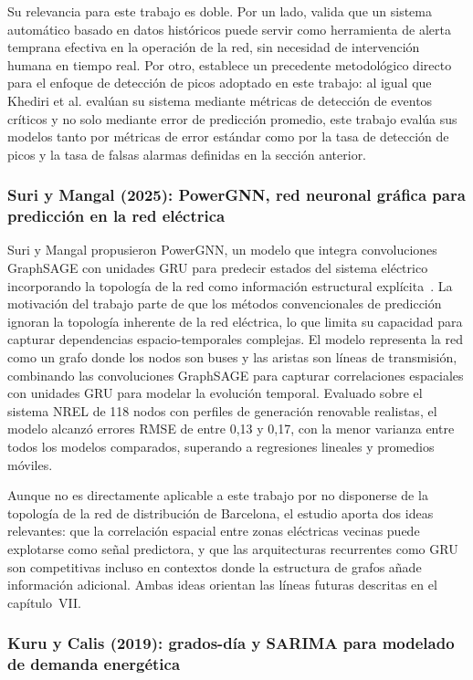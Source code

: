 \documentclass[12pt, a4paper]{article}
\begin{document}
Su relevancia para este trabajo es doble. Por un lado, valida que un sistema automático basado en datos históricos puede servir como herramienta de alerta temprana efectiva en la operación de la red, sin necesidad de intervención humana en tiempo real. Por otro, establece un precedente metodológico directo para el enfoque de detección de picos adoptado en este trabajo: al igual que Khediri et al. evalúan su sistema mediante métricas de detección de eventos críticos y no solo mediante error de predicción promedio, este trabajo evalúa sus modelos tanto por métricas de error estándar como por la tasa de detección de picos y la tasa de falsas alarmas definidas en la sección anterior.

\subsubsection{Suri y Mangal (2025): PowerGNN, red neuronal gráfica para predicción en la red eléctrica}

Suri y Mangal propusieron PowerGNN, un modelo que integra convoluciones GraphSAGE con unidades GRU para predecir estados del sistema eléctrico incorporando la topología de la red como información estructural explícita~\cite{suri2025}. La motivación del trabajo parte de que los métodos convencionales de predicción ignoran la topología inherente de la red eléctrica, lo que limita su capacidad para capturar dependencias espacio-temporales complejas. El modelo representa la red como un grafo donde los nodos son buses y las aristas son líneas de transmisión, combinando las convoluciones GraphSAGE para capturar correlaciones espaciales con unidades GRU para modelar la evolución temporal. Evaluado sobre el sistema NREL de 118 nodos con perfiles de generación renovable realistas, el modelo alcanzó errores RMSE de entre 0,13 y 0,17, con la menor varianza entre todos los modelos comparados, superando a regresiones lineales y promedios móviles.

Aunque no es directamente aplicable a este trabajo por no disponerse de la topología de la red de distribución de Barcelona, el estudio aporta dos ideas relevantes: que la correlación espacial entre zonas eléctricas vecinas puede explotarse como señal predictora, y que las arquitecturas recurrentes como GRU son competitivas incluso en contextos donde la estructura de grafos añade información adicional. Ambas ideas orientan las líneas futuras descritas en el capítulo~VII.

\subsubsection{Kuru y Calis (2019): grados-día y SARIMA para modelado de demanda energética}
\end{document}

